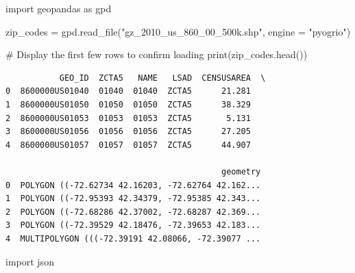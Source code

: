 \documentclass[
  letterpaper,
  DIV=11,
  numbers=noendperiod]{scrartcl}
\newenvironment{Shaded}{\begin{snugshade}}{\end{snugshade}}
\newcommand{\BuiltInTok}[1]{\textcolor[rgb]{0.00,0.23,0.31}{#1}}
\newcommand{\CommentTok}[1]{\textcolor[rgb]{0.37,0.37,0.37}{#1}}
\newcommand{\ImportTok}[1]{\textcolor[rgb]{0.00,0.46,0.62}{#1}}
\newcommand{\NormalTok}[1]{\textcolor[rgb]{0.00,0.23,0.31}{#1}}
\newcommand{\OperatorTok}[1]{\textcolor[rgb]{0.37,0.37,0.37}{#1}}
\newcommand{\StringTok}[1]{\textcolor[rgb]{0.13,0.47,0.30}{#1}}
\begin{document}
\begin{Shaded}
\begin{Highlighting}[]
\ImportTok{import}\NormalTok{ geopandas }\ImportTok{as}\NormalTok{ gpd}

\NormalTok{zip\_codes }\OperatorTok{=}\NormalTok{ gpd.read\_file(}\StringTok{"gz\_2010\_us\_860\_00\_500k.shp"}\NormalTok{, engine }\OperatorTok{=} \StringTok{"pyogrio"}\NormalTok{)}

\CommentTok{\# Display the first few rows to confirm loading}
\BuiltInTok{print}\NormalTok{(zip\_codes.head())}
\end{Highlighting}
\end{Shaded}

\begin{verbatim}
           GEO_ID  ZCTA5   NAME   LSAD  CENSUSAREA  \
0  8600000US01040  01040  01040  ZCTA5      21.281   
1  8600000US01050  01050  01050  ZCTA5      38.329   
2  8600000US01053  01053  01053  ZCTA5       5.131   
3  8600000US01056  01056  01056  ZCTA5      27.205   
4  8600000US01057  01057  01057  ZCTA5      44.907   

                                            geometry  
0  POLYGON ((-72.62734 42.16203, -72.62764 42.162...  
1  POLYGON ((-72.95393 42.34379, -72.95385 42.343...  
2  POLYGON ((-72.68286 42.37002, -72.68287 42.369...  
3  POLYGON ((-72.39529 42.18476, -72.39653 42.183...  
4  MULTIPOLYGON (((-72.39191 42.08066, -72.39077 ...  
\end{verbatim}

\begin{Shaded}
\begin{Highlighting}[]
\ImportTok{import}\NormalTok{ json}
\end{Highlighting}
\end{Shaded}
\end{document}
